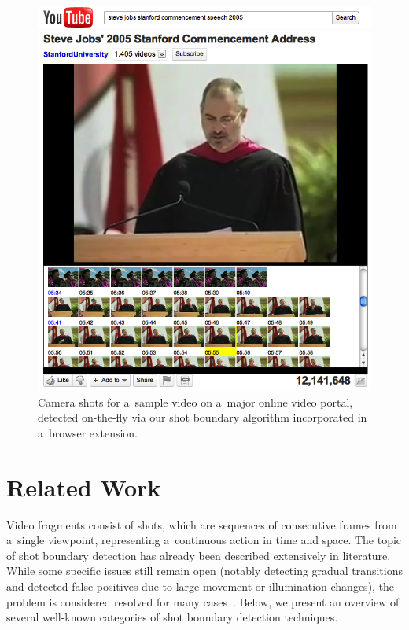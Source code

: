 \begin{figure}
  \begin{center}
    \includegraphics[width=1.0\linewidth]{./stevejobs.png}
  \end{center}
  \caption[Camera shots for a~sample video on  
    a~major online video portal]
    {Camera shots for a~sample video on 
    a~major online video portal, detected on-the-fly via
    our shot boundary algorithm incorporated
    in a~browser extension.}
  \label{fig:screenshot}
\end{figure}

\section{Related Work} 
Video fragments consist of shots, which are sequences of
consecutive frames from a~single viewpoint,
representing a~continuous action in time and space.
The topic of shot boundary detection has already been described
extensively in literature.
While some specific issues still remain open
(notably detecting gradual transitions and detected false positives
due to large movement or illumination changes),
the problem is considered resolved for many
cases~\cite{yuan2007shotboundary,hanjalic2002shotboundary}.
Below, we present an overview of several well-known categories of shot boundary detection techniques.

